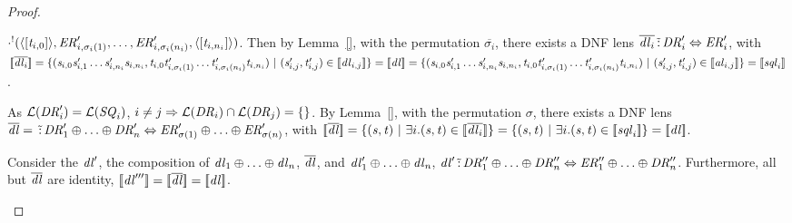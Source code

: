 \documentclass[numbers,10pt,preprint\ifanon ,nocopyrightspace\fi]{sigplanconf}
\begin{document}
\begin{proof}
\begin{case}[\ParallelDNFStructuralRewriteRule{},\ParallelDNFStructuralRewriteRule{}]
\begin{enumerate}
      $\cdot^!(\langle[\mathit{t}_{i,0}]\rangle,
        \mathit{ER}_{i,\sigma_i(1)}',\ldots,\mathit{ER}_{i,\sigma_i(n_i)}',
        \langle[\mathit{t}_{i,n_i}]\rangle)$.
      Then by Lemma~\ref{}, with the permutation $\overline{\sigma_i}$,
      there exists a DNF lens
      $\overline{\mathit{dl}_i} \,\tilde{:}\, \mathit{DR}_i' \Leftrightarrow
      \mathit{ER}_i'$,
      with $\SemanticsOf{\overline{\DNFLens_i}} =
      \SetOf{(\String_{i,0}\String_{i,1}'\ldots\String_{i,n_i}'\String_{i,n_i},
        \StringAlt_{i,0}\StringAlt_{i,\sigma_i(1)}'\ldots\StringAlt_{i,\sigma_i(n_i)}'\StringAlt_{i,n_i})
        \SuchThat
        (\String_{i,j}',\StringAlt_{i,j}') \in \SemanticsOf{\DNFLens_{i,j}}} =
      \SemanticsOf{\DNFLens} =
      \SetOf{(\String_{i,0}\String_{i,1}'\ldots\String_{i,n_i}'\String_{i,n_i},
        \StringAlt_{i,0}\StringAlt_{i,\sigma_i(1)}'\ldots\StringAlt_{i,\sigma_i(n_i)}'\StringAlt_{i,n_i})
        \SuchThat
        (\String_{i,j}',\StringAlt_{i,j}') \in \SemanticsOf{\AtomLens_{i,j}}} =
      \SemanticsOf{\SequenceLens_i}$.

      As $\mathcal{L}(\mathit{DR}_i') = \mathcal{L}(\mathit{SQ}_i)$,
      $i \neq j \Rightarrow \mathcal{L}(\mathit{DR}_i) \cap
      \mathcal{L}(\mathit{DR}_j) = \{\}$.
      By Lemma~\ref{}, with the permutation $\sigma$, there exists a DNF lens
      $\overline{\mathit{dl}} = \,\tilde{:}\,
      \mathit{DR}_1' \oplus \ldots \oplus \mathit{DR}_n'
      \Leftrightarrow
      \mathit{ER}_{\sigma(1)}' \oplus \ldots \oplus \mathit{ER}_{\sigma(n)}'$,
      with $\SemanticsOf{\overline{\DNFLens}} =
      \SetOf{(\String,\StringAlt) \SuchThat \exists i. (\String,\StringAlt) \in
        \SemanticsOf{\overline{\DNFLens_i}}} =
      \SetOf{(\String,\StringAlt) \SuchThat \exists i. (\String,\StringAlt) \in
        \SemanticsOf{\SequenceLens_i}} =
      \SemanticsOf{\DNFLens}$.

      Consider the $\mathit{dl}'$, the composition of
      $\mathit{dl}_1 \oplus \ldots \oplus \mathit{dl}_n$, $\overline{\mathit{dl}}$, and
      $\mathit{dl}_1' \oplus \ldots \oplus \mathit{dl}_n$,
      $\mathit{dl}' \,\tilde{:}\, \mathit{DR}_1'' \oplus \ldots \oplus
      \mathit{DR}_n'' \Leftrightarrow
      \mathit{ER}_1'' \oplus \ldots \oplus \mathit{DR}_n''$.
      Furthermore, all but $\overline{\mathit{dl}}$ are identity,
      $[ \! [\mathit{dl}'''] \! ] = [ \! [\overline{\mathit{dl}}] \! ] =
      [ \! [\mathit{dl}] \! ]$.
    \end{enumerate}
  \end{case}
\end{proof}
\end{document}
